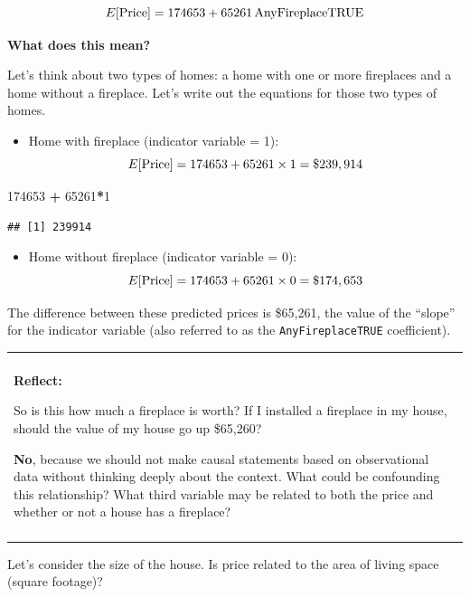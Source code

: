 \documentclass[]{book}
\newenvironment{Shaded}{\begin{snugshade}}{\end{snugshade}}
\newcommand{\DataTypeTok}[1]{\textcolor[rgb]{0.13,0.29,0.53}{#1}}
\newcommand{\DecValTok}[1]{\textcolor[rgb]{0.00,0.00,0.81}{#1}}
\newcommand{\KeywordTok}[1]{\textcolor[rgb]{0.13,0.29,0.53}{\textbf{#1}}}
\newcommand{\NormalTok}[1]{#1}
\newcommand{\OperatorTok}[1]{\textcolor[rgb]{0.81,0.36,0.00}{\textbf{#1}}}
\newcommand{\StringTok}[1]{\textcolor[rgb]{0.31,0.60,0.02}{#1}}
\providecommand{\tightlist}{%
  \setlength{\itemsep}{0pt}\setlength{\parskip}{0pt}}
\newenvironment{reflect}
{
    \begin{center}
    
    \begin{tabular}{|p{0.8\textwidth}|}
    \rowcolor{LightBlue}
    \hline\\
    \rowcolor{LightBlue}
    \textbf{Reflect:}
}
{
    \\\rowcolor{LightBlue}
    \\\hline
    \end{tabular} 
    \end{center}
}
\begin{document}
\[ E[\hbox{Price}] = 174653 + 65261\,\hbox{AnyFireplaceTRUE} \]

\textbf{What does this mean?}

Let's think about two types of homes: a home with one or more fireplaces and a home without a fireplace. Let's write out the equations for those two types of homes.

\begin{itemize}
\tightlist
\item
  Home with fireplace (indicator variable = 1):\\
  \[ E[\hbox{Price}] = 174653 + 65261 \times 1 = \$ 239,914 \]
\end{itemize}

\begin{Shaded}
\begin{Highlighting}[]
\DecValTok{174653} \OperatorTok{+}\StringTok{ }\DecValTok{65261}\OperatorTok{*}\DecValTok{1}
\end{Highlighting}
\end{Shaded}

\begin{verbatim}
## [1] 239914
\end{verbatim}

\begin{itemize}
\tightlist
\item
  Home without fireplace (indicator variable = 0):\\
  \[ E[\hbox{Price}] = 174653 + 65261 \times 0 = \$ 174,653 \]
\end{itemize}

The difference between these predicted prices is \$65,261, the value of the ``slope'' for the indicator variable (also referred to as the \texttt{AnyFireplaceTRUE} coefficient).

\begin{reflect}
So is this how much a fireplace is worth? If I installed a fireplace in
my house, should the value of my house go up \$65,260?

\textbf{No}, because we should not make causal statements based on
observational data without thinking deeply about the context. What could
be confounding this relationship? What third variable may be related to
both the price and whether or not a house has a fireplace?
\end{reflect}

Let's consider the size of the house. Is price related to the area of living space (square footage)?

\begin{Shaded}
\end{Shaded}
\end{document}
